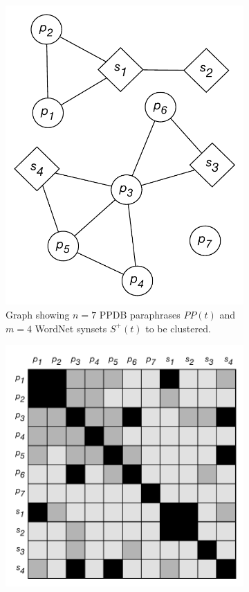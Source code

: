 \documentclass[11pt]{article}
\begin{document}
	\begin{figure}[th]
		\begin{subfigure}[t]{0.25\textwidth}
			\includegraphics[width=\textwidth]{images/pp_syn_graph.pdf}
			\caption{Graph showing $n=7$ PPDB paraphrases $PP(t)$ and $m=4$ WordNet synsets $S^+(t)$ to be clustered.}
			\label{fig:ppsyngraph}
		\end{subfigure}
		\hfill%
		\begin{subfigure}[t]{0.36\textwidth}
			\includegraphics[width=\textwidth]{images/pp_syn_mat_all.pdf}

\end{subfigure}
\end{figure}
\end{document}
